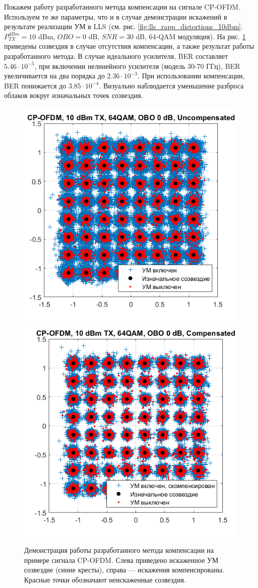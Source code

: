 Покажем работу разработанного метода компенсации на сигнале CP-OFDM.
Используем те же параметры, что и в случае демонстрации искажений в
результате реализации УМ в LLS (см. рис.
\ref{fig:lls_rapp_distortions_10dbm}. $P^{dBm}_{TX} = 10$ dBm, $OBO = 0$
dB, $SNR=30$ dB, 64-QAM модуляция). На рис.
\ref{fig:ofdm_lls_compensation_10dbm} приведены созвездия в случае
отсутствия компенсации, а также результат работы разработанного метода.
В случае идеального усилителя, BER составляет $5.46\cdot 10^{-5}$, при включении
нелинейного усилителя (модель 30-70 ГГц), BER увеличивается на два порядка
до $2.36\cdot 10^{-3}$. При использовании компенсации, BER понижается до
$3.85\cdot 10^{-4}$. Визуально наблюдается уменьшение разброса облаков
вокруг изначальных точек созвездия.

\begin{figure}[h!]
    \centering
    \includegraphics[width=0.45\linewidth]{figs/ofdm_pa_on_obo0_TX10_noPN2.png}
    \includegraphics[width=0.45\linewidth]{figs/ofdm_pa_on_comp_obo0_TX10_noPN.png}
    \caption{Демонстрация работы разработанного метода компенсации на
    примере сигнала CP-OFDM. Слева приведено искаженное УМ созвездие (синие
    кресты), справа — искажения компенсированы. Красные точки обозначают
    неискаженные созвездия.}
    \label{fig:ofdm_lls_compensation_10dbm}
\end{figure}





